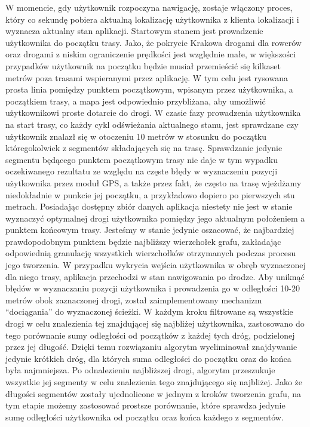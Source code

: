 W momencie, gdy użytkownik rozpoczyna nawigację, zostaje włączony proces, który co sekundę pobiera aktualną lokalizację użytkownika z klienta lokalizacji i wyznacza aktualny stan aplikacji. Startowym stanem jest prowadzenie użytkownika do początku trasy. Jako, że pokrycie Krakowa drogami dla rowerów oraz drogami z niskim ograniczenie prędkości jest względnie małe, w większości przypadków użytkownik na początku będzie musiał przemieścić się kilkaset metrów poza trasami wspieranymi przez aplikację. W tym celu jest rysowana prosta linia pomiędzy punktem początkowym, wpisanym przez użytkownika, a początkiem trasy, a mapa jest odpowiednio przybliżana, aby umożliwić użytkownikowi proste dotarcie do drogi. \newline
W czasie fazy prowadzenia użytkownika na start trasy, co każdy cykl odświeżania aktualnego stanu, jest sprawdzane czy użytkownik znalazł się w otoczeniu 10 metrów w stosunku do początku któregokolwiek z segmentów składających się na trasę. Sprawdzanie jedynie segmentu będącego punktem początkowym trasy nie daje w tym wypadku oczekiwanego rezultatu ze względu na częste błędy w wyznaczeniu pozycji użytkownika przez moduł GPS, a także przez fakt, że często na trasę wjeżdżamy niedokładnie w punkcie jej początku, a przykładowo dopiero po pierwszych stu metrach. Posiadając dostępny zbiór danych aplikacja niestety nie jest w stanie wyznaczyć optymalnej drogi użytkownika pomiędzy jego aktualnym położeniem a punktem końcowym trasy. Jesteśmy w stanie jedynie oszacować, że najbardziej prawdopodobnym punktem będzie najbliższy wierzchołek grafu, zakładając odpowiednią granulację wszystkich wierzchołków otrzymanych podczas procesu jego tworzenia. \newline
W przypadku wykrycia wejścia użytkownika w obręb wyznaczonej dla niego trasy, aplikacja przechodzi w stan nawigowania po drodze. Aby uniknąć błędów w wyznaczaniu pozycji użytkownika i prowadzenia go w odległości 10-20 metrów obok zaznaczonej drogi, został zaimplementowany mechanizm ``dociągania'' do wyznaczonej ścieżki. W każdym kroku filtrowane są wszystkie drogi w celu znalezienia tej znajdującej się najbliżej użytkownika, zastosowano do tego porównanie sumy odległości od początków z każdej tych dróg, podzielonej przez jej długość. Dzięki temu rozwiązaniu algorytm wyeliminował znajdywanie jedynie krótkich dróg, dla których suma odległości do początku oraz do końca była najmniejsza. \newline
Po odnalezieniu najbliższej drogi, algorytm przeszukuje wszystkie jej segmenty w celu znalezienia tego znajdującego się najbliżej. Jako że długości segmentów zostały ujednolicone w jednym z kroków tworzenia grafu, na tym etapie możemy zastosować prostsze porównanie, które sprawdza jedynie sumę odległości użytkownika od początku oraz końca każdego z segmentów.
